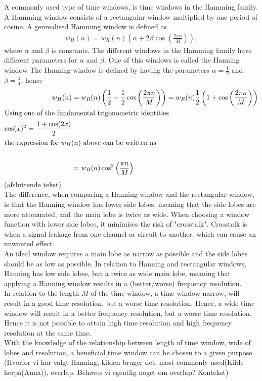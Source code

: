 A commonly used type of time windows, is time windows in the Hamming family. A Hamming window consists of a rectangular window multiplied by one period of cosine. A genrealised Hamming window is defined as
\begin{align*}
    w_H(n)=w_R(n) \left(\alpha +2\beta \cos\left(\frac{2\pi n}{M}\right)\right),
\end{align*}
where $\alpha$ and $\beta$ is constants. The different windows in the Hamming family have different parameters for $\alpha$ and $\beta$. 
One of this windows is called the Hanning window
The Hanning window is defined by having the parameters $\alpha = \frac{1}{2} $ and $\beta = \frac{1}{4}$, hence
\begin{align*}
    w_H(n)&=w_R(n) \left(\frac{1}{2} + \frac{1}{2} \cos\left(\frac{2\pi n}{M}\right)\right) = w_R(n) \frac{1}{2}\left(1+\cos\left(\frac{2\pi n}{M}\right)\right)\\
    \intertext{Using one of the fundamental trigonometric identities} \cos(x)^2=\frac{1+\cos(2x)}{2}\\
    \intertext{the expression for $w_H(n)$ above can be written as}\\
    &=w_R(n)\cos^2\left(\frac{\pi n}{M}\right)
\end{align*}
(afsluttende tekst)
\\
The difference, when comparing a Hanning window and the rectangular window, is that the Hanning window has lower side lobes, meaning that the side lobes are more attenuated, and the main lobe is twice as wide. When choosing a window function with lower side lobes, it minimises the risk of "crosstalk". Crosstalk is when a signal leakage from one channel or circuit to another, which can cause an unwanted effect. \\

An ideal window requires a main lobe as narrow as possible and the side lobes should be as low as possible\cite[56]{layer2015signal}. In relation to Hanning and rectangular windows, Hanning has low side lobes, but a twice as wide main lobe, meaning that applying a Hanning window results in a (better/worse) frequency resolution.
\\
In relation to the length $M$ of the time window, a time window narrow, will result in a good time resolution, but a worse time resolution. Hence, a wide time window will result in a better frequency resolution, but a worse time resolution.
Hence it is not possible to attain high time resolution and high frequency resolution at the same time. 
\\
With the knowledge of the relationship between length of time window, wide of lobes and resolution, a beneficial time window can be chosen to a given purpose. 
(Hvorfor vi har valgt Hanning, kilden bruger det, most commonly used(Kilde herpå(Anna)), overlap. Behøves vi egentlig noget om overlap? Kontekst)

